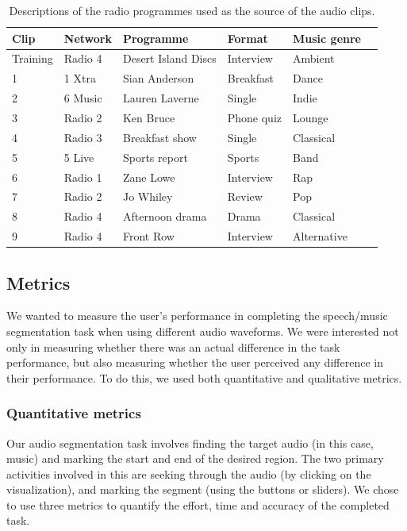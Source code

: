 \begin{table}[htbp]
  \begin{center}
    {\small
    \begin{tabular}{l l l l l l}
      \hline
      \textbf{Clip} & \textbf{Network} & \textbf{Programme} & \textbf{Format} & \textbf{Music genre} \\ \hline
      Training & Radio 4 & Desert Island Discs & Interview & Ambient \\
      1 & 1 Xtra & Sian Anderson & Breakfast & Dance \\
      2 & 6 Music & Lauren Laverne & Single & Indie \\
      3 & Radio 2 & Ken Bruce & Phone quiz & Lounge \\
      4 & Radio 3 & Breakfast show & Single & Classical \\
      5 & 5 Live & Sports report & Sports & Band \\
      6 & Radio 1 & Zane Lowe & Interview & Rap \\
      7 & Radio 2 & Jo Whiley & Review & Pop \\
      8 & Radio 4 & Afternoon drama & Drama & Classical \\
      9 & Radio 4 & Front Row & Interview & Alternative \\ \hline
    \end{tabular}
  }
  \end{center}
  \caption{Descriptions of the radio programmes used as the source of the audio clips.}
  \label{tab:clips}
\end{table}

\subsection{Metrics}

We wanted to measure the user's performance in completing the speech/music segmentation task when using different audio
waveforms. We were interested not only in measuring whether there was an actual difference in the task performance, but
also measuring whether the user perceived any difference in their performance.  To do this, we used both quantitative
and qualitative metrics.

\subsubsection{Quantitative metrics}
Our audio segmentation task involves finding the target audio (in this case, music) and marking the start and end of
the desired region. The two primary activities involved in this are seeking through the audio (by clicking on the
visualization), and marking the segment (using the buttons or sliders).  We chose to use three metrics to quantify the
effort, time and accuracy of the completed task.

